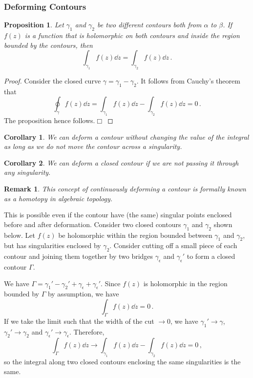 \documentclass{article}
\theoremstyle{plain}\theoremheaderfont{\normalfont\itshape}\theorembodyfont{\rmfamily}\theoremseparator{.}\newtheorem*{rem}{Remark}\newtheorem*{ex}{Example}\newtheorem*{proof}{Proof}\newtheorem*{altp}{Alternative proof}
\theoremstyle{plain}\theoremheaderfont{\normalfont\bfseries}\theorembodyfont{\rmfamily}\theoremseparator{.}\newtheorem{thm}{Theorem}[section]\newtheorem{lem}[thm]{Lemma}\newtheorem{prop}[thm]{Proposition}\newtheorem*{cor}{Corollary}\newtheorem{defn}[thm]{Definition}\newtheorem{clm}[thm]{Claim}\newtheorem{clminproof}{Claim}
\theoremstyle{break}\theoremheaderfont{\normalfont\itshape}\theorembodyfont{\rmfamily}\theoremseparator{.\medskip}\newtheorem*{proofskip}{Proof}\newtheorem*{exs}{Examples}\newtheorem*{rems}{Remarks}
\theoremstyle{break}\theoremheaderfont{\normalfont\bfseries}\theorembodyfont{\rmfamily}\theoremseparator{.\medskip}\newtheorem{lemskip}[thm]{Lemma}\newtheorem{defnskip}[thm]{Definition}\newtheorem{propskip}[thm]{Proposition}\newtheorem{thmskip}[thm]{Theorem}
\numberwithin{equation}{section}
\newcommand{\qed}{\hfill\ensuremath{\Box}}
\begin{document}
	\subsubsection{Deforming Contours}
	\begin{prop}
		Let \(\gamma_1\) and \(\gamma_2\) be two different contours both from \(\alpha\) to \(\beta\). If \(f(z)\) is a function that is holomorphic on both contours and inside the region bounded by the contours, then
		\[\int_{\gamma_1}f(z)\dd{z}=\int_{\gamma_2}f(z)\dd{z}\,.\]
	\end{prop}
	\begin{proof}
		Consider the closed curve \(\gamma=\gamma_1-\gamma_2\). It follows from Cauchy's theorem that
		\[\oint_\gamma f(z)\dd{z}=\int_{\gamma_1}f(z)\dd{z}-\int_{\gamma_2}f(z)\dd{z}=0\,.\]
		The proposition hence follows.\qed
	\end{proof}
	\begin{cor}
		We can deform a contour without changing the value of the integral as long as we do not move the contour across a singularity.
	\end{cor}
	\begin{cor}
		We can deform a closed contour if we are not passing it through any singularity.
	\end{cor}
	\begin{rem}
		This concept of continuously deforming a contour is formally known as a \textit{homotopy} in algebraic topology.
	\end{rem}
	This is possible even if the contour have (the same) singular points enclosed before and after deformation. Consider two closed contours \(\gamma_1\) and \(\gamma_2\) shown below. Let \(f(z)\) be holomorphic within the region bounded between \(\gamma_1\) and \(\gamma_2\), but has singularities enclosed by \(\gamma_2\). Consider cutting off a small piece of each contour and joining them together by two bridges \(\gamma_\epsilon\) and \(\gamma_\epsilon'\) to form a closed contour \(\Gamma\).

	We have \(\Gamma=\gamma_1'-\gamma_2'+\gamma_\epsilon+\gamma_\epsilon'\). Since \(f(z)\) is holomorphic in the region bounded by \(\Gamma\) by assumption, we have
	\[\int_\Gamma f(z)\dd{z}=0\,.\]
	If we take the limit such that the width of the cut \(\to 0\), we have \(\gamma_1'\to\gamma\), \(\gamma_2'\to\gamma_2\) and \(\gamma_\epsilon'\to\gamma_\epsilon\). Therefore,
	\[\int_\Gamma f(z)\dd{z}\to\int_{\gamma_1}f(z)\dd{z}-\int_{\gamma_2}f(z)\dd{z}=0\,,\]
	so the integral along two closed contours enclosing the same singularities is the same.
\end{document}
